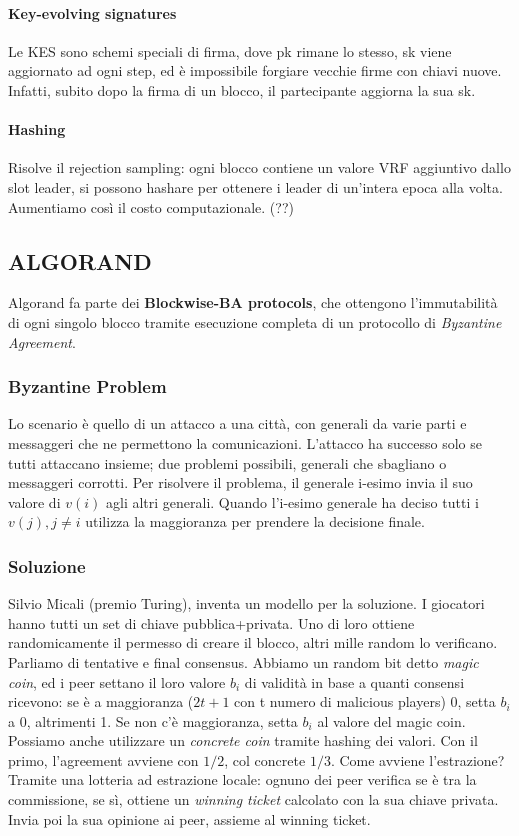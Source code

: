 \documentclass[11pt]{article}
\begin{document}
\paragraph{Key-evolving signatures} Le KES sono schemi speciali di firma, dove pk rimane lo stesso, sk viene aggiornato ad ogni step, ed è impossibile forgiare vecchie firme con chiavi nuove. Infatti, subito dopo la firma di un blocco, il partecipante aggiorna la sua sk.
\paragraph{Hashing} Risolve il rejection sampling: ogni blocco contiene un valore VRF aggiuntivo dallo slot leader, si possono hashare per ottenere i leader di un'intera epoca alla volta. Aumentiamo così il costo computazionale. (??)

\subsection{ALGORAND}
Algorand fa parte dei \textbf{Blockwise-BA protocols}, che ottengono l'immutabilità di ogni singolo blocco tramite esecuzione completa di un protocollo di \textit{Byzantine Agreement}.
\subsubsection{Byzantine Problem}
Lo scenario è quello di un attacco a una città, con generali da varie parti e messaggeri che ne permettono la comunicazioni. L'attacco ha successo solo se tutti attaccano insieme; due problemi possibili, generali che sbagliano o messaggeri corrotti. Per risolvere il problema, il generale i-esimo invia il suo valore di $v(i)$ agli altri generali. Quando l'i-esimo generale ha deciso tutti i $v(j), j \neq i$ utilizza la maggioranza per prendere la decisione finale. 
\subsubsection{Soluzione} 
Silvio Micali (premio Turing), inventa un modello per la soluzione. I giocatori hanno tutti un set di chiave pubblica+privata. Uno di loro ottiene randomicamente il permesso di creare il blocco, altri mille random lo verificano. Parliamo di tentative e final consensus. Abbiamo un random bit detto \textit{magic coin}, ed i peer settano il loro valore $b_i$ di validità in base a quanti consensi ricevono: se è a maggioranza ($2t+1$ con t numero di malicious players) 0, setta $b_i$ a 0, altrimenti 1. Se non c'è maggioranza, setta $b_i$ al valore del magic coin. Possiamo anche utilizzare un \textit{concrete coin} tramite hashing dei valori. Con il primo, l'agreement avviene con $1/2$, col concrete $1/3$. Come avviene l'estrazione? Tramite una lotteria ad estrazione locale: ognuno dei peer verifica se è tra la commissione, se sì, ottiene un \textit{winning ticket} calcolato con la sua chiave privata. Invia poi la sua opinione ai peer, assieme al winning ticket.
\end{document}
